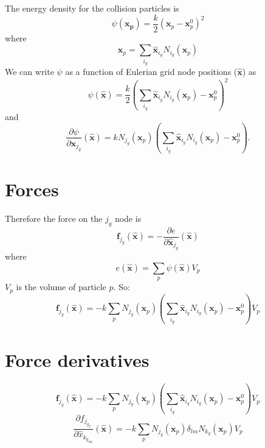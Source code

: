 \documentclass[11pt,fullpage]{article}
\newcommand{\mb}[1]{\mathbf{#1}}
\begin{document}
The energy density for the collision particles is
$$
\psi(\mb{x_p})=\frac{k}{2}(\mb{x}_p-\mb{x}^0_p)^2
$$
where
$$
\mb{x}_p=\sum_{i_g}{\hat{\mb{x}}_{i_g}N_{i_g}(\mb{x}_p)}
$$
We can write $\psi$ as a function of Eulerian grid node positions ($\hat{\mb{x}}$) as
$$
\psi(\hat{\mb{x}})=\frac{k}{2}(\sum_{i_g}\hat{\mb{x}}_{i_g}N_{i_g}(\mb{x}_p)-\mb{x}^0_p)^2
$$
and
$$
\frac{\partial \psi}{\partial{\hat{\mb x}_{j_g}}}(\hat {\mb x})=kN_{j_g}(\mb{x}_p)(\sum_{i_g}\hat{\mb{x}}_{i_g}N_{i_g}(\mb{x}_p)-\mb{x}^0_p).
$$
\section{Forces}
Therefore the force on the $j_g$ node is
$$
\mb{f}_{j_g}\left(\hat{\mb{x}}\right)=-\frac{\partial e}{\partial \hat{\mb{x}}_{j_g}}\left(\hat{\mb{x}}\right)
$$
where
$$
e\left(\hat{\mb{x}}\right)=\sum_p\psi(\hat{\mb x})V_p
$$
$V_p$ is the volume of particle $p$. So:
$$
\mb{f}_{j_g}\left(\hat{\mb{x}}\right)=-k\sum_p{N_{j_g}(\mb{x}_p)(\sum_{i_g}\hat{\mb{x}}_{i_g}N_{i_g}(\mb{x}_p)-\mb{x}^0_p)V_p}
$$
\section{Force derivatives}
$$
\mb{f}_{j_g}\left(\hat{\mb{x}}\right)=-k\sum_p{N_{j_g}(\mb{x}_p)(\sum_{i_g}\hat{\mb{x}}_{i_g}N_{i_g}(\mb{x}_p)-\mb{x}^0_p)V_p}
$$
$$
\frac{\partial {f_{{j_g}_l}}}{\partial \hat{x}_{{k_g}_m}}\left(\hat{\mb{x}}\right)=-k\sum_p{N_{j_g}(\mb{x}_p)\delta_{lm}N_{k_g}(\mb{x}_p)V_p}
$$
\end{document}
